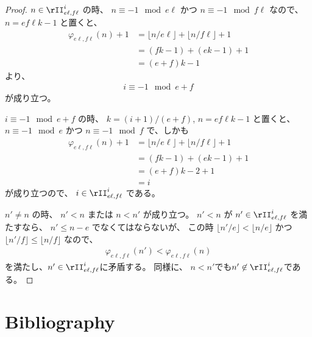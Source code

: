 \begin{proof}
$
n \in \rII_{e \ell,f \ell}^i
$
の時、
$
n \equiv -1 \mod e \ell
$
かつ
$
n \equiv -1 \mod f \ell
$
なので、
$
n = e f \ell k - 1
$
と置くと、
\begin{align}
\varphi_{e \ell, f \ell}(n) + 1
&= \lfloor n / e \ell \rfloor + \lfloor n / f \ell \rfloor + 1 \\
&= (f k - 1) + (e k - 1) + 1 \\
&= (e + f) k - 1
\end{align}
より、
\begin{align}
i \equiv -1 \mod e + f
\end{align}
が成り立つ。

$
i \equiv -1 \mod e + f
$
の時、
$
k = (i+1) / (e + f)
$,
$
n = e f \ell k - 1
$
と置くと、
$
n \equiv -1 \mod e
$
かつ
$
n \equiv -1 \mod f
$
で、しかも
\begin{align}
\varphi_{e \ell, f \ell}(n) + 1
&= \lfloor n / e \ell \rfloor + \lfloor n / f \ell \rfloor + 1\\
&= (f k - 1) + (e k - 1) + 1\\
&= (e + f) k - 2 + 1\\
&= i
\end{align}
が成り立つので、
$
i \in \rII_{e \ell, f\ell}^i
$
である。

$
n' \ne n
$
の時、
$
n' < n
$
または
$
n < n'
$
が成り立つ。
$
n' < n
$
が
$
n' \in \rII_{e \ell,f \ell}^i
$
を満たすなら、
$
n' \le n - e
$
でなくてはならないが、
この時
$
\lfloor n'/e \rfloor < \lfloor n/e \rfloor
$
かつ
$
\lfloor n'/f \rfloor \le \lfloor n/f \rfloor
$
なので、
\begin{align}
\varphi_{e \ell, f \ell}(n')
 < \varphi_{e \ell, f \ell}(n)
\end{align}
を満たし、$n' \in \rII_{e \ell,f \ell}^i$に矛盾する。
同様に、
$n < n'$でも$n' \not \in \rII_{e \ell,f \ell}^i$である。
\end{proof}




\chapter{Bibliography}

\def\cprime{$'$} \def\cprime{$'$}
\providecommand{\bysame}{\leavevmode\hbox to3em{\hrulefill}\thinspace}
\providecommand{\MR}{\relax\ifhmode\unskip\space\fi MR }
\providecommand{\MRhref}[2]{%
  \href{http://www.ams.org/mathscinet-getitem?mr=#1}{#2}
}
\providecommand{\href}[2]{#2}
\newcommand{\arXiv}[1]{\href{https://arxiv.org/abs/#1}{arXiv:#1}}

